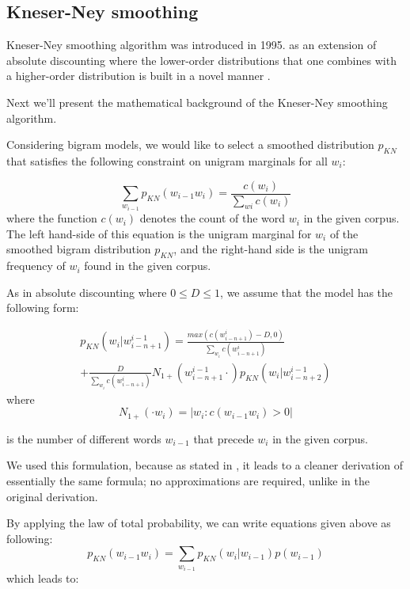 \documentclass[twoside]{article}
\begin{document}
\begin{multicols}{2}
\subsection{Kneser-Ney smoothing}
Kneser-Ney smoothing algorithm was introduced in 1995. as an extension of absolute discounting where the lower-order distributions that one combines with a higher-order distribution is built in a novel manner \cite{1_chen1999empirical}. 

Next we\rq{}ll present the mathematical background of the Kneser-Ney smoothing algorithm.

Considering bigram models, we would like to select a smoothed distribution $p_{KN}$ that satisfies the following constraint on unigram marginals for all $w_i$:

\begin{equation}
\sum_{w_{i - 1}} p_{KN}(w_{i-1}w_{i} ) = \frac{c(w_{i})}{\sum_{w{i}} c(w_{i})}
\end{equation}
where the function $c(w_{i})$ denotes the count of the word $w_{i}$ in the given corpus. The left hand-side of this equation is the unigram marginal for $w_{i}$ of the smoothed bigram distribution $p_{KN}$, and the right-hand side is the unigram frequency of $w_{i}$ found in the given corpus.

As in absolute discounting where $0 \le D \le 1$, we assume that the model has the following form:

\begin{multline}
p_{KN}(w_{i} | w_{i-n+1}^{i-1}) = \frac{max(c(w_{i-n+1}^{i}) - D, 0)}{\sum_{w_{i}} c(w_{i-n+1}^{i})}  \\ + \frac{D}{\sum_{w_{i}} c(w_{i-n+1}^{i})} N_{1+}(w_{i-n+1}^{i-1} \cdot) p_{KN}(w_{i} | w_{i-n+2}^{i-1}) 
\end{multline}
where 
\begin{equation}
N_{1+}(\cdot w_{i}) = |{w_{i} : c(w_{i-1}w_{i}) > 0}|
\end{equation}

is the number of different words $w_{i-1}$ that precede $w_{i}$ in the given corpus.

We used this formulation, because as stated in \cite{1_chen1999empirical}, it leads to a cleaner derivation of essentially the same formula; no approximations are required, unlike in the original derivation.

By applying the law of total probability, we can write equations given above as following:
\begin{equation}
p_{KN}(w_{i-1}w_{i} ) = \sum_{w_{i-1}} p_{KN}(w_{i} | w_{i-1} )p(w_{i-1})
\end{equation}
which leads to:


\end{multicols}
\end{document}
